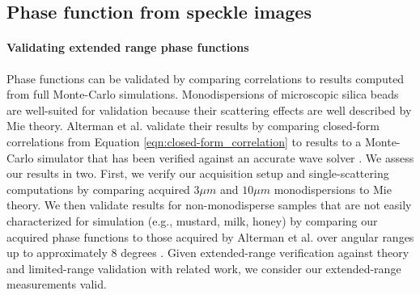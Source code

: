 \subsection{Phase function from speckle images}

\paragraph{Validating extended range phase functions}
Phase functions can be validated by comparing correlations to results computed from full Monte-Carlo simulations. Monodispersions of microscopic silica beads are well-suited for validation because their scattering effects are well described by Mie theory. Alterman et al. validate their results by comparing closed-form correlations from Equation \ref{eqn:closed-form_correlation} to results to a Monte-Carlo simulator \cite{bar2019monte} that has been verified against an accurate wave solver \cite{thierry2015mu}. We assess our results in two. First, we verify our acquisition setup and single-scattering computations by comparing acquired $3\mu m$ and $10\mu m$ monodispersions to Mie theory. We then validate results for non-monodisperse samples that are not easily characterized for simulation (e.g., mustard, milk, honey) by comparing our acquired phase functions to those acquired by Alterman et al. over angular ranges up to approximately 8 degrees \cite{alterman2022direct}. Given extended-range verification against theory and limited-range validation with related work, we consider our extended-range measurements valid.
